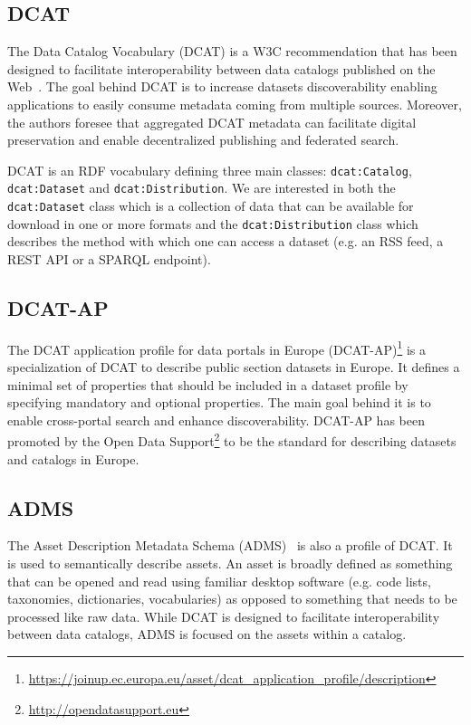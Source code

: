 \subsection{DCAT}
The Data Catalog Vocabulary (DCAT) is a W3C recommendation that has been designed to facilitate interoperability between data catalogs published on the Web~\cite{Erickson:DCV:14}. The goal behind DCAT is to increase datasets discoverability enabling applications to easily consume metadata coming from multiple sources. Moreover, the authors foresee that aggregated DCAT metadata can facilitate digital preservation and enable decentralized publishing and federated search.

DCAT is an RDF vocabulary defining three main classes: \texttt{dcat:Catalog},\\\texttt{dcat:Dataset} and \texttt{dcat:Distribution}. We are interested in both the \\\texttt{dcat:Dataset} class which is a collection of data that can be available for download in one or more formats and the \texttt{dcat:Distribution} class which describes the method with which one can access a dataset (e.g. an RSS feed, a REST API or a SPARQL endpoint).

\subsection{DCAT-AP}
The DCAT application profile for data portals in Europe (DCAT-AP)\footnote{\url{https://joinup.ec.europa.eu/asset/dcat\_application\_profile/description}} is a specialization of DCAT to describe public section datasets in Europe. It defines a minimal set of properties that should be included in a dataset profile by specifying mandatory and optional properties. The main goal behind it is to enable cross-portal search and enhance discoverability. DCAT-AP has been promoted by the Open Data Support\footnote{\url{http://opendatasupport.eu}} to be the standard for describing datasets and catalogs in Europe.

\subsection{ADMS}
The Asset Description Metadata Schema (ADMS)~\cite{Archer:W3C:13} is also a profile of DCAT. It is used to semantically describe assets. An asset is broadly defined as something that can be opened and read using familiar desktop software (e.g. code lists, taxonomies, dictionaries, vocabularies) as opposed to something that needs to be processed like raw data. While DCAT is designed to facilitate interoperability between data catalogs, ADMS is focused on the assets within a catalog.

